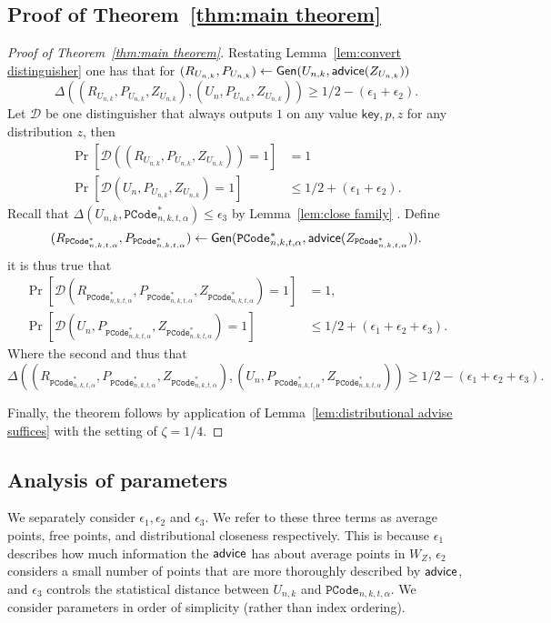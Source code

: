 \subsection{Proof of Theorem~\ref{thm:main theorem}}
\label{ssec:proof main theorem}
\begin{proof}[Proof of Theorem~\ref{thm:main theorem}]
Restating Lemma~\ref{lem:convert distinguisher} one has that for $(R_{U_{n,k}},P_{U_{n,k}}) \leftarrow {\ensuremath{\mathsf{Gen}}}(U_{n,k}, {\mathsf{advice}}(Z_{U_{n,k}}))$
\[
\Delta((R_{U_{n,k}}, P_{U_{n,k}}, Z_{U_{n,k}}), (U_n, P_{U_{n,k}}, Z_{U_{n,k}}))\ge 1/2-(\epsilon_1+\epsilon_2).
\]
Let $\mathcal{D}$ be one distinguisher that always outputs $1$ on any value $\mathsf{key}, p, z$ for any distribution $z$, then
\begin{align*}
\Pr[\mathcal{D}((R_{U_{n,k}}, P_{U_{n,k}}, Z_{U_{n,k}}))=1] &=1\\
\Pr[\mathcal{D}(U_n, P_{U_{n,k}}, Z_{U_{n,k}})=1]&\le 1/2+(\epsilon_1+\epsilon_2).
\end{align*}
Recall that $\Delta(U_{n,k}, \mathtt{PCode}_{n, k, t, \alpha}^{*}) \le \epsilon_3$ by Lemma~\ref{lem:close family} .  Define \[(R_{\mathtt{PCode}_{n, k, t, \alpha}^{*}}, P_{\mathtt{PCode}_{n, k, t, \alpha}^{*}})\leftarrow {\ensuremath{\mathsf{Gen}}}(\mathtt{PCode}_{n, k, t, \alpha}^{*}, {\mathsf{advice}}(Z_{\mathtt{PCode}_{n, k, t, \alpha}^{*}})).\]
it is thus true that 
\begin{align*}
\Pr[\mathcal{D}(R_{\mathtt{PCode}_{n, k, t, \alpha}^{*}}, P_{\mathtt{PCode}_{n, k, t, \alpha}^{*}}, Z_{\mathtt{PCode}_{n, k, t, \alpha}^{*}})=1]&=1,\\
\Pr[\mathcal{D}(U_n, P_{\mathtt{PCode}_{n, k, t, \alpha}^{*}}, Z_{\mathtt{PCode}_{n, k, t, \alpha}^{*}})=1]&\le 1/2+(\epsilon_1+\epsilon_2+\epsilon_3).
\end{align*}
Where the second 
and thus that 
\[
\Delta((R_{\mathtt{PCode}_{n, k, t, \alpha}^{*}}, P_{\mathtt{PCode}_{n, k, t, \alpha}^{*}}, Z_{\mathtt{PCode}_{n, k, t, \alpha}^{*}}), (U_n, P_{\mathtt{PCode}_{n, k, t, \alpha}^{*}}, Z_{\mathtt{PCode}_{n, k, t, \alpha}^{*}}))\ge 1/2-(\epsilon_1+\epsilon_2+\epsilon_3).
\]

\noindent
Finally, the theorem follows by application of Lemma~\ref{lem:distributional advise suffices} with the setting of $\zeta = 1/4$.
\end{proof} 



\subsection{Analysis of parameters}
\label{ssec:analysis params}
We separately consider $\epsilon_1, \epsilon_2$ and $\epsilon_3$. We refer to these three terms as average points, free points, and distributional closeness respectively. This is because $\epsilon_1$ describes how much information the ${\mathsf{advice}}$ has about average points in $W_Z$, $\epsilon_2$ considers a small number of points that are more thoroughly described by ${\mathsf{advice}}$, and $\epsilon_3$ controls the statistical distance between $U_{n, k}$ and $\mathtt{PCode}_{n, k, t, \alpha}$.  We consider parameters in order of simplicity (rather than index ordering).



